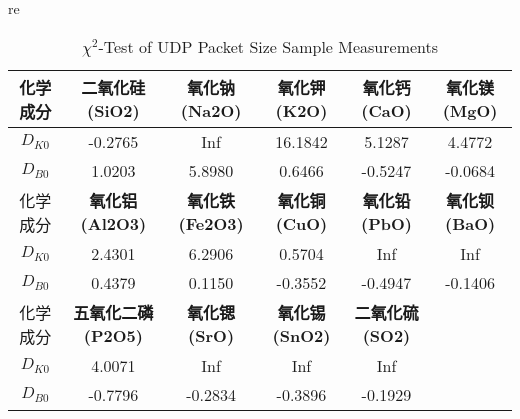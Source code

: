 \documentclass{article}
\begin{document}
    re
    \begin{longtable}{cccccc}
        \caption{$\chi^2$-Test of UDP Packet Size Sample Measurements}
        \label{Table1}\\
        化学成分                 & \multicolumn{1}{c}{\textbf{二氧化硅(SiO2)}}  & \multicolumn{1}{c}{\textbf{氧化钠(Na2O)}}  & \multicolumn{1}{c}{\textbf{氧化钾(K2O)}}  & \multicolumn{1}{c}{\textbf{氧化钙(CaO)}}  & \multicolumn{1}{c}{\textbf{氧化镁(MgO)}} \\\midrule
$D_{K0}$             &  -0.2765 & Inf      &16.1842 &5.1287 &4.4772\\ 
$D_{B0}$             &  1.0203 &5.8980 &0.6466 &-0.5247 &-0.0684\\\midrule
化学成分                 & \multicolumn{1}{c}{\textbf{氧化铝(Al2O3)}}  & \multicolumn{1}{c}{\textbf{氧化铁(Fe2O3)}} & \multicolumn{1}{c}{\textbf{氧化铜(CuO)}}  & \multicolumn{1}{c}{\textbf{氧化铅(PbO)}}  & \multicolumn{1}{c}{\textbf{氧化钡(BaO)}} \\\midrule
$D_{K0}$             & 2.4301 &6.2906  &0.5704   &Inf        &Inf \\
$D_{B0}$             &  0.4379 &0.1150 & -0.3552 &-0.4947 &-0.1406 \\\midrule
化学成分                 & \multicolumn{1}{c}{\textbf{五氧化二磷(P2O5)}} & \multicolumn{1}{c}{\textbf{氧化锶(SrO)}}   & \multicolumn{1}{c}{\textbf{氧化锡(SnO2)}} & \multicolumn{1}{c}{\textbf{二氧化硫(SO2)}} &                                       \\\midrule
$D_{K0}$             & 4.0071 &Inf         &Inf         &Inf \\
$D_{B0}$             &  -0.7796 &-0.2834 &-0.3896 &-0.1929\\
    \end{longtable}
\end{document}

